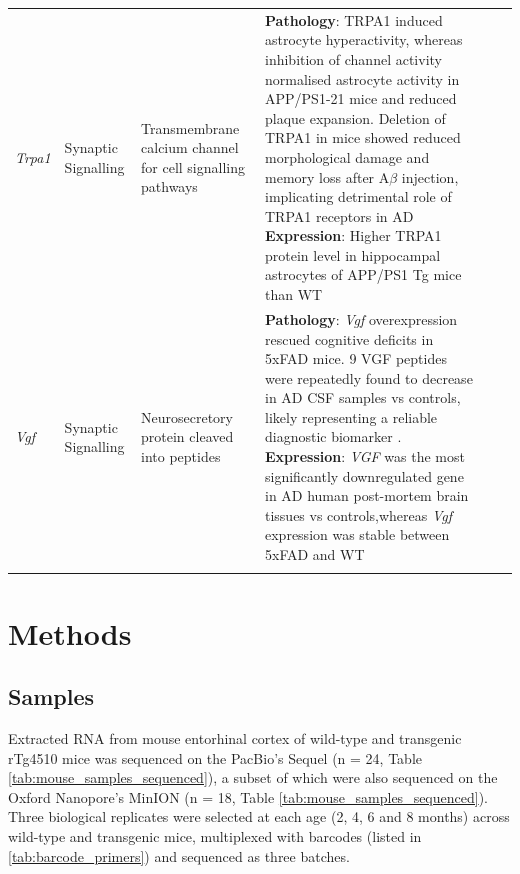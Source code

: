 \begin{changemargin}{1.5cm}
\begin{landscape}
\begin{longtable}[c]{p{1cm}p{2cm}p{4cm}p{16cm}p{1cm}p{1cm}}
			\centering \textit{Trpa1} &
			\centering Synaptic Signalling  &
			\centering Transmembrane calcium channel for cell signalling pathways\newline &
			\tabitem \textbf{Pathology}: TRPA1 induced astrocyte hyperactivity, whereas inhibition of channel activity normalised astrocyte activity in APP/PS1-21 mice and reduced plaque expansion\cite{Lee2016a}. Deletion of TRPA1 in mice showed reduced morphological damage and memory loss after A$\beta$ injection, implicating detrimental role of TRPA1 receptors in AD\cite{Payrits2020} \newline
			\tabitem \textbf{Expression}: Higher TRPA1 protein level in hippocampal astrocytes of APP/PS1 Tg mice than WT\cite{Lee2016a} \\
			\hdashline[0.5pt/5pt]	
			
			\centering \textit{Vgf} &
			\centering Synaptic Signalling  &
			\centering Neurosecretory protein cleaved into peptides \newline &
			\tabitem \textbf{Pathology}: \textit{Vgf} overexpression rescued cognitive deficits in 5xFAD mice\cite{Bai2020}. 9 VGF peptides were repeatedly found to decrease in AD CSF samples vs controls, likely representing a reliable diagnostic biomarker \cite{VanSteenoven2019}. \newline
			\tabitem \textbf{Expression}: \textit{VGF} was the most significantly downregulated gene in AD human post-mortem brain tissues vs controls\cite{Beckmann2020},whereas \textit{Vgf} expression was stable between 5xFAD and WT\cite{Bai2020} \\
			\hdashline[0.5pt/5pt]		
			
			\centering  &
			\centering &
			\centering  &
			\tabitem \\* \bottomrule
		\end{longtable}
	\end{landscape}
\end{changemargin}


 

\section{Methods}

\subsection{Samples}
Extracted RNA from mouse entorhinal cortex of wild-type and transgenic rTg4510 mice was sequenced on the PacBio's Sequel (n = 24, Table \ref{tab:mouse_samples_sequenced}), a subset of which were also sequenced on the Oxford Nanopore's MinION (n = 18, Table \ref{tab:mouse_samples_sequenced}). Three biological replicates were selected at each age (2, 4, 6 and 8 months) across wild-type and transgenic mice, multiplexed with barcodes (listed in \cref{tab:barcode_primers}) and sequenced as three batches.

